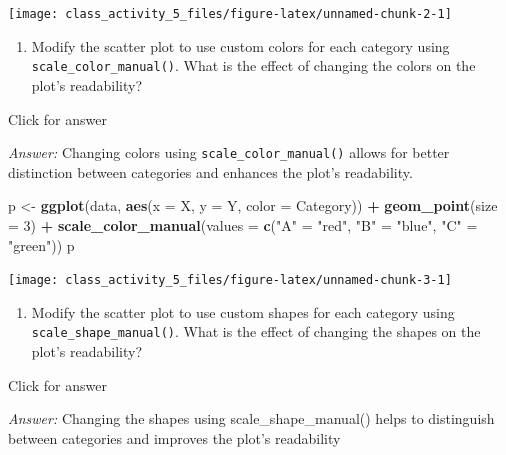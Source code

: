 \documentclass[
]{book}
\newenvironment{Shaded}{\begin{snugshade}}{\end{snugshade}}
\newcommand{\AttributeTok}[1]{\textcolor[rgb]{0.13,0.29,0.53}{#1}}
\newcommand{\DecValTok}[1]{\textcolor[rgb]{0.00,0.00,0.81}{#1}}
\newcommand{\FunctionTok}[1]{\textcolor[rgb]{0.13,0.29,0.53}{\textbf{#1}}}
\newcommand{\NormalTok}[1]{#1}
\newcommand{\OtherTok}[1]{\textcolor[rgb]{0.56,0.35,0.01}{#1}}
\newcommand{\SpecialCharTok}[1]{\textcolor[rgb]{0.81,0.36,0.00}{\textbf{#1}}}
\newcommand{\StringTok}[1]{\textcolor[rgb]{0.31,0.60,0.02}{#1}}
\providecommand{\tightlist}{%
  \setlength{\itemsep}{0pt}\setlength{\parskip}{0pt}}
\begin{document}
\texttt{[image: class\_activity\_5\_files/figure-latex/unnamed-chunk-2-1]}

\begin{enumerate}
\def\labelenumi{\alph{enumi}.}
\tightlist
\item
  Modify the scatter plot to use custom colors for each category using \texttt{scale\_color\_manual()}. What is the effect of changing the colors on the plot's readability?
\end{enumerate}

Click for answer

\emph{Answer:} Changing colors using \texttt{scale\_color\_manual()} allows for better distinction between categories and enhances the plot's readability.

\begin{Shaded}
\begin{Highlighting}[]
\NormalTok{p }\OtherTok{\textless{}{-}} \FunctionTok{ggplot}\NormalTok{(data, }\FunctionTok{aes}\NormalTok{(}\AttributeTok{x =}\NormalTok{ X, }\AttributeTok{y =}\NormalTok{ Y, }\AttributeTok{color =}\NormalTok{ Category)) }\SpecialCharTok{+}
  \FunctionTok{geom\_point}\NormalTok{(}\AttributeTok{size =} \DecValTok{3}\NormalTok{) }\SpecialCharTok{+}
  \FunctionTok{scale\_color\_manual}\NormalTok{(}\AttributeTok{values =} \FunctionTok{c}\NormalTok{(}\StringTok{"A"} \OtherTok{=} \StringTok{"red"}\NormalTok{, }\StringTok{"B"} \OtherTok{=} \StringTok{"blue"}\NormalTok{, }\StringTok{"C"} \OtherTok{=} \StringTok{"green"}\NormalTok{))}
\NormalTok{p}
\end{Highlighting}
\end{Shaded}

\texttt{[image: class\_activity\_5\_files/figure-latex/unnamed-chunk-3-1]}

\begin{enumerate}
\def\labelenumi{\alph{enumi}.}
\setcounter{enumi}{1}
\tightlist
\item
  Modify the scatter plot to use custom shapes for each category using \texttt{scale\_shape\_manual()}. What is the effect of changing the shapes on the plot's readability?
\end{enumerate}

Click for answer

\emph{Answer:} Changing the shapes using scale\_shape\_manual() helps to distinguish between categories and improves the plot's readability
\end{document}
